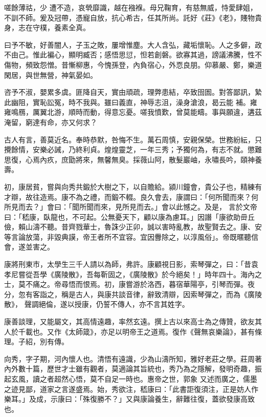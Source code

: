 \begin{pinyinscope}
 嗟餘薄祜，少
 遭不造，哀煢靡識，越在襁褓。母兄鞠育，有慈無威，恃愛肆姐，不訓不師。爰及冠帶，憑寵自放，抗心希古，任其所尚。託好《莊》《老》，賤物貴身，志在守樸，養素全真。



 曰予不敏，好善闇人，子玉之敗，屢增惟塵。大人含弘，藏垢懷恥。人之多僻，政不由己。惟此褊心，顯明臧否；感悟思愆，怛若創磐。欲寡其過，謗議沸騰，性不傷物，頻致怨憎。昔慚柳惠，今愧孫登，內負宿心，外恧良朋。仰慕嚴、鄭，樂道閑居，與世無營，神氣晏如。



 咨予不淑，嬰累多虞。匪降自天，實由頑疏，理弊患結，卒致囹圄。對答鄙訊，縶此幽阻，實恥訟冤，時不我與。雖曰義直，神辱志沮，澡身滄浪，曷云能
 補。雍雍鳴鴈，厲翼北游，順時而動，得意忘憂。嗟我憤歎，曾莫能疇。事與願違，遘茲淹留，窮達有命，亦又何求？



 古人有言，善莫近名。奉時恭默，咎悔不生。萬石周慎，安親保榮。世務紛紜，只攪餘情，安樂必誡，乃終利貞。煌煌靈芝，一年三秀；予獨何為，有志不就。懲難思復，心焉內疚，庶勖將來，無馨無臭。採薇山阿，散髮巖岫，永嘯長吟，頤神養壽。



 初，康居貧，嘗與向秀共鍛於大樹之下，以自贍給。潁川鐘會，貴公子也，精練有才辯，故往造焉。康不為之禮，而鍛不輟。良久會去，康謂曰：「何所聞而來？何所見而去？」會曰：「聞所聞而來，見所見而去。」會以此憾之。及是，
 言於文帝曰：「嵇康，臥龍也，不可起。公無憂天下，顧以康為慮耳。」因譖「康欲助毌丘儉，賴山濤不聽。昔齊戮華士，魯誅少正卯，誠以害時亂教，故聖賢去之。康、安等言論放蕩，非毀典謨，帝王者所不宜容。宜因釁除之，以淳風俗」。帝既暱聽信會，遂並害之。



 康將刑東市，太學生三千人請以為師，弗許。康顧視日影，索琴彈之，曰：「昔袁孝尼嘗從吾學《廣陵散》，吾每靳固之，《廣陵散》於今絕矣！」時年四十。海內之士，莫不痛之。帝尋悟而恨焉。初，康嘗游於洛西，暮宿華陽亭，引琴而彈。夜分，忽有客詣之，稱是古人，與康共談音律，辭致清辯，因索琴彈之，而為《廣陵散》，
 聲調絕倫，遂以授康，仍誓不傳人，亦不言其姓字。



 康善談理，又能屬文，其高情遠趣，率然玄遠。撰上古以來高士為之傳贊，欲友其人於千載也。又作《太師箴》，亦足以明帝王之道焉。復作《聲無哀樂論》，甚有條理。子紹，別有傳。



 向秀，字子期，河內懷人也。清悟有遠識，少為山濤所知，雅好老莊之學。莊周著內外數十篇，歷世才士雖有觀者，莫適論其旨統也，秀乃為之隱解，發明奇趣，振起玄風，讀之者超然心悟，莫不自足一時也。惠帝之世，郭象
 又述而廣之，儒墨之迹見鄙，道家之言遂盛焉。始，秀欲注，嵇康曰：「此書詎復須注，正是妨人作樂耳。」及成，示康曰：「殊復勝不？」又與康論養生，辭難往復，蓋欲發康高致也。




\end{pinyinscope}
